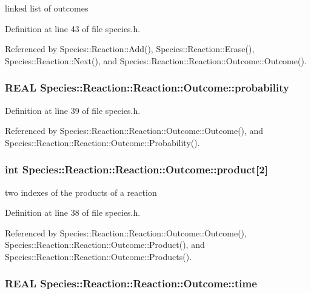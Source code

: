 linked list of outcomes 



Definition at line 43 of file species.h.

Referenced by Species::Reaction::Add(), Species::Reaction::Erase(), Species::Reaction::Next(), and Species::Reaction::Reaction::Outcome::Outcome().\hypertarget{structSpecies_1_1Reaction_1_1Outcome_7db6b3e12d84984760d20418877463e4}{
\subsubsection[{probability}]{\setlength{\rightskip}{0pt plus 5cm}REAL Species::Reaction::Reaction::Outcome::probability}}
\label{structSpecies_1_1Reaction_1_1Outcome_7db6b3e12d84984760d20418877463e4}




Definition at line 39 of file species.h.

Referenced by Species::Reaction::Reaction::Outcome::Outcome(), and Species::Reaction::Reaction::Outcome::Probability().\hypertarget{structSpecies_1_1Reaction_1_1Outcome_a9db2fbca0e21ce3059f4bfc3867d637}{
\subsubsection[{product}]{\setlength{\rightskip}{0pt plus 5cm}int Species::Reaction::Reaction::Outcome::product\mbox{[}2\mbox{]}}}
\label{structSpecies_1_1Reaction_1_1Outcome_a9db2fbca0e21ce3059f4bfc3867d637}


two indexes of the products of a reaction 



Definition at line 38 of file species.h.

Referenced by Species::Reaction::Reaction::Outcome::Outcome(), Species::Reaction::Reaction::Outcome::Product(), and Species::Reaction::Reaction::Outcome::Products().\hypertarget{structSpecies_1_1Reaction_1_1Outcome_654cf802ce7437099ab5fcb4cb1a670d}{
\subsubsection[{time}]{\setlength{\rightskip}{0pt plus 5cm}REAL Species::Reaction::Reaction::Outcome::time}}
\label{structSpecies_1_1Reaction_1_1Outcome_654cf802ce7437099ab5fcb4cb1a670d}


